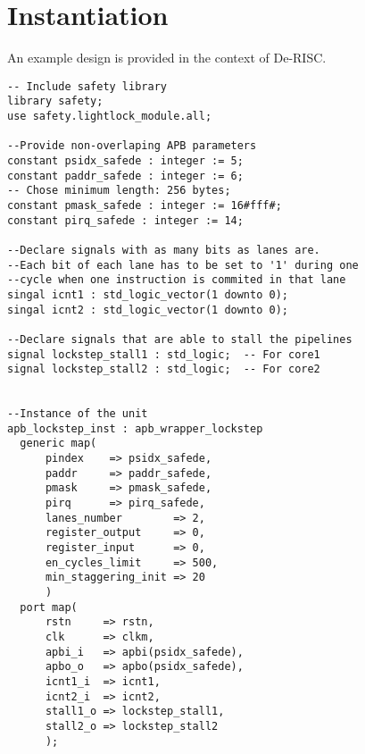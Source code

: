 \section{Instantiation}
An example design is provided in the context of De-RISC.
\\
\belowcaptionskip=-10pt
\begin{lstlisting}[label=ins-prot,caption=SafeDE instance example for gpp\_sys,style=vhdl]
-- Include safety library
library safety;
use safety.lightlock_module.all;

--Provide non-overlaping APB parameters
constant psidx_safede : integer := 5;
constant paddr_safede : integer := 6;
-- Chose minimum length: 256 bytes;
constant pmask_safede : integer := 16#fff#;  
constant pirq_safede : integer := 14;

--Declare signals with as many bits as lanes are.
--Each bit of each lane has to be set to '1' during one 
--cycle when one instruction is commited in that lane
singal icnt1 : std_logic_vector(1 downto 0);
singal icnt2 : std_logic_vector(1 downto 0);

--Declare signals that are able to stall the pipelines
signal lockstep_stall1 : std_logic;  -- For core1
signal lockstep_stall2 : std_logic;  -- For core2


--Instance of the unit
apb_lockstep_inst : apb_wrapper_lockstep
  generic map(
      pindex    => psidx_safede,
      paddr     => paddr_safede,            
      pmask     => pmask_safede,
      pirq      => pirq_safede,
      lanes_number        => 2,
      register_output     => 0,
      register_input      => 0,
      en_cycles_limit     => 500,
      min_staggering_init => 20
      )
  port map(
      rstn     => rstn,
      clk      => clkm,
      apbi_i   => apbi(psidx_safede),
      apbo_o   => apbo(psidx_safede),
      icnt1_i  => icnt1, 
      icnt2_i  => icnt2, 
      stall1_o => lockstep_stall1,
      stall2_o => lockstep_stall2
      );

\end{lstlisting}



